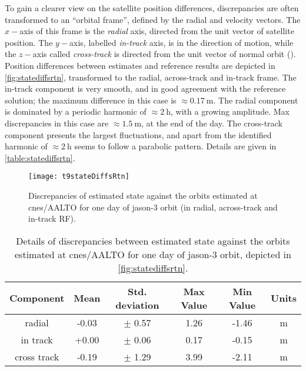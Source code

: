To gain a clearer view on the satellite position differences, discrepancies are often 
transformed to an ``orbital frame'', defined by the radial and velocity vectors. 
The $x-$axis of this frame is the \emph{radial} axis, directed from the unit vector of 
satellite position. The $y-$axis, labelled \emph{in-track} axis, is in the direction 
of motion, while the $z-$axis called \emph{cross-track} is directed from the unit 
vector of normal orbit (\cite{Eunhyouek2019}). Position differences between estimates and 
reference results are depicted in \autoref{fig:statediffsrtn}, transformed to the radial, 
across-track and in-track frame. The in-track component is very smooth, and in good 
agreement with the reference solution; the maximum difference in this case is 
$\approx \SI{0.17}{\meter}$. The radial component is dominated by a periodic harmonic of 
$\approx \SI{2}{\hour}$, with a growing amplitude. Max discrepancies in this case are 
$\approx \SI{1.5}{\meter}$, at the end of the day. The cross-track component presents the 
largest fluctuations, and apart from the identified harmonic of $\approx \SI{2}{\hour}$ 
seems to follow a parabolic pattern. Details are given in \autoref{table:statediffsrtn}.
\begin{figure}[ht]
    \centering
    \texttt{[image: t9stateDiffsRtn]}
    \caption{Discrepancies of estimated state against the orbits estimated at \gls{cnes}/AALTO for one day of \gls{jason}-3 orbit (in radial, across-track and in-track RF).}
    \label{fig:statediffsrtn}
\end{figure}

\begin{table}[h!]
    \centering
    \begin{tabularx}{\textwidth}{cccccc}
        \toprule
        \textbf{Component} & \textbf{Mean} & \textbf{Std. deviation} & \textbf{Max Value} & \textbf{Min Value} & \textbf{Units}\\
        \hline
        radial &  -0.03 & $\pm$ 0.57 & 1.26 & -1.46 & \si{\metre}\\
        in track &  +0.00 & $\pm$ 0.06 & 0.17 & -0.15 & \si{\metre}\\
        cross track &  -0.19 & $\pm$ 1.29 & 3.99 & -2.11 & \si{\metre}\\
       \bottomrule
    \end{tabularx}
    \caption{Details of discrepancies between estimated state against the orbits estimated at \gls{cnes}/AALTO for one day of \gls{jason}-3 orbit, depicted in \autoref{fig:statediffsrtn}.}
    \label{table:statediffsrtn}
\end{table}

